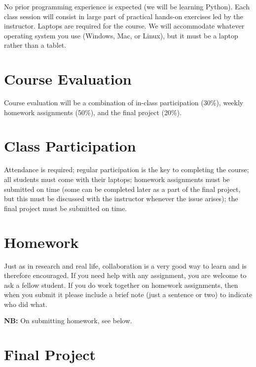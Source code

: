 \documentclass[
]{book}
\begin{document}
No prior programming experience is expected (we will be learning Python). Each class session will consist in large part of practical hands-on exercises led by the instructor. Laptops are required for the course. We will accommodate whatever operating system you use (Windows, Mac, or Linux), but it must be a laptop rather than a tablet.

\hypertarget{course-evaluation}{%
\section*{Course Evaluation}\label{course-evaluation}}

Course evaluation will be a combination of in-class participation (30\%), weekly homework assignments (50\%), and the final project (20\%).

\hypertarget{class-participation}{%
\section*{Class Participation}\label{class-participation}}

Attendance is required; regular participation is the key to completing the course; all students must come with their laptops; homework assignments must be submitted on time (some can be completed later as a part of the final project, but this must be discussed with the instructor whenever the issue arises); the final project must be submitted on time.

\hypertarget{homework}{%
\section*{Homework}\label{homework}}

Just as in research and real life, collaboration is a very good way to learn and is therefore encouraged. If you need help with any assignment, you are welcome to ask a fellow student. If you do work together on homework assignments, then when you submit it please include a brief note (just a sentence or two) to indicate who did what.

\textbf{NB:} On submitting homework, see below.

\hypertarget{final-project}{%
\section*{Final Project}\label{final-project}}
\end{document}
